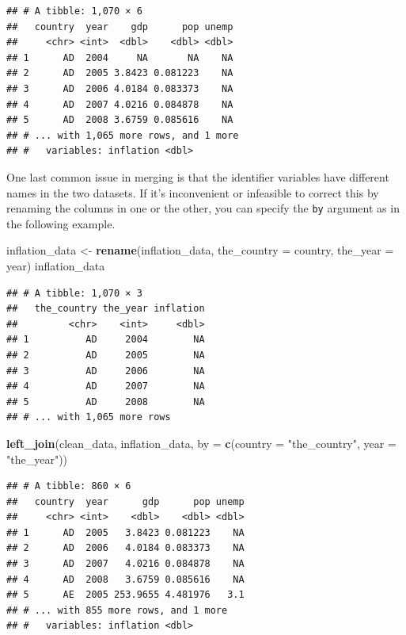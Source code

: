 \documentclass[12pt,oneside,openany]{tufte-book}
\newenvironment{Shaded}{}{}
\newcommand{\KeywordTok}[1]{\textcolor[rgb]{0.00,0.44,0.13}{\textbf{{#1}}}}
\newcommand{\DataTypeTok}[1]{\textcolor[rgb]{0.56,0.13,0.00}{{#1}}}
\newcommand{\StringTok}[1]{\textcolor[rgb]{0.25,0.44,0.63}{{#1}}}
\newcommand{\NormalTok}[1]{{#1}}
\begin{document}
\begin{verbatim}
## # A tibble: 1,070 × 6
##   country  year    gdp      pop unemp
##     <chr> <int>  <dbl>    <dbl> <dbl>
## 1      AD  2004     NA       NA    NA
## 2      AD  2005 3.8423 0.081223    NA
## 3      AD  2006 4.0184 0.083373    NA
## 4      AD  2007 4.0216 0.084878    NA
## 5      AD  2008 3.6759 0.085616    NA
## # ... with 1,065 more rows, and 1 more
## #   variables: inflation <dbl>
\end{verbatim}

One last common issue in merging is that the identifier variables have
different names in the two datasets. If it's inconvenient or infeasible
to correct this by renaming the columns in one or the other, you can
specify the \texttt{by} argument as in the following example.

\begin{Shaded}
\begin{Highlighting}[]
\NormalTok{inflation_data <-}\StringTok{ }\KeywordTok{rename}\NormalTok{(inflation_data, }\DataTypeTok{the_country =} \NormalTok{country, }
    \DataTypeTok{the_year =} \NormalTok{year)}
\NormalTok{inflation_data}
\end{Highlighting}
\end{Shaded}

\begin{verbatim}
## # A tibble: 1,070 × 3
##   the_country the_year inflation
##         <chr>    <int>     <dbl>
## 1          AD     2004        NA
## 2          AD     2005        NA
## 3          AD     2006        NA
## 4          AD     2007        NA
## 5          AD     2008        NA
## # ... with 1,065 more rows
\end{verbatim}

\begin{Shaded}
\begin{Highlighting}[]
\KeywordTok{left_join}\NormalTok{(clean_data, inflation_data, }\DataTypeTok{by =} \KeywordTok{c}\NormalTok{(}\DataTypeTok{country =} \StringTok{"the_country"}\NormalTok{, }
    \DataTypeTok{year =} \StringTok{"the_year"}\NormalTok{))}
\end{Highlighting}
\end{Shaded}

\begin{verbatim}
## # A tibble: 860 × 6
##   country  year      gdp      pop unemp
##     <chr> <int>    <dbl>    <dbl> <dbl>
## 1      AD  2005   3.8423 0.081223    NA
## 2      AD  2006   4.0184 0.083373    NA
## 3      AD  2007   4.0216 0.084878    NA
## 4      AD  2008   3.6759 0.085616    NA
## 5      AE  2005 253.9655 4.481976   3.1
## # ... with 855 more rows, and 1 more
## #   variables: inflation <dbl>
\end{verbatim}
\end{document}
